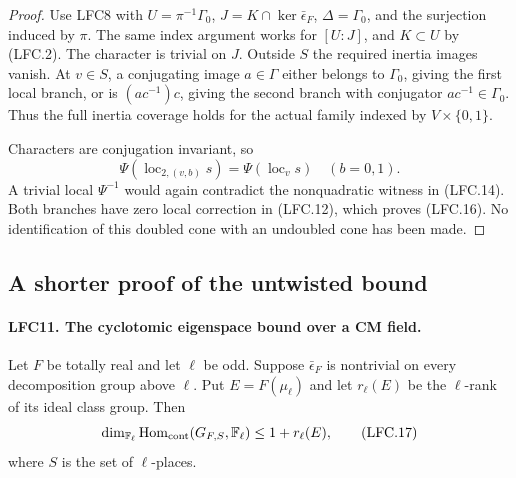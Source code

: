 \begin{proof}
Use LFC8 with \(U=\pi^{-1}\Gamma_0\),
\(J=K\cap\ker\bar\epsilon_F\), \(\Delta=\Gamma_0\), and
the surjection induced by \(\pi\).  The same index argument
works for \([U:J]\), and \(K\subset U\) by (LFC.2).
The character is trivial on \(J\).
Outside \(S\) the required inertia images vanish.
At \(v\in S\), a conjugating image \(a\in\Gamma\) either
belongs to \(\Gamma_0\), giving the first local branch,
or is \((ac^{-1})c\), giving the second branch with
conjugator \(ac^{-1}\in\Gamma_0\).
Thus the full inertia coverage holds for the actual
family indexed by \(V\times\{0,1\}\).

Characters are conjugation invariant, so
\[
 \Psi(\operatorname{loc}_{2,(v,b)}s)
                  =\Psi(\operatorname{loc}_v s)
                     \quad(b=0,1).
\]
A trivial local \(\Psi^{-1}\) would again contradict the
nonquadratic witness in (LFC.14).
Both branches have zero local correction in (LFC.12),
which proves (LFC.16).  No identification of this doubled
cone with an undoubled cone has been made.
\end{proof}

\subsection{A shorter proof of the untwisted bound}

\paragraph{LFC11. The cyclotomic eigenspace bound over a CM field.}
\label{claim:LFC11}
Let \(F\) be totally real and let \(\ell\) be odd.
Suppose \(\bar\epsilon_F\) is nontrivial on every
decomposition group above \(\ell\).
Put \(E=F(\mu_\ell)\) and let \(r_\ell(E)\) be the
\(\ell\)-rank of its ideal class group.  Then
\[
 \dim_{\mathbb F_\ell}
   \operatorname{Hom}_{\rm cont}
      (G_{F,S},\mathbb F_\ell)\le 1+r_\ell(E),
                                                        \tag{LFC.17}
\]
where \(S\) is the set of \(\ell\)-places.

